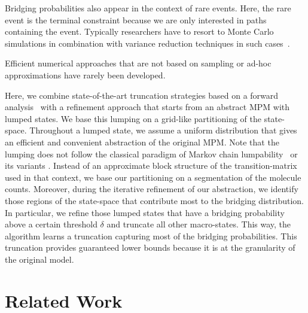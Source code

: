 
Bridging probabilities also appear in the context
of rare events.
Here, the rare event is the terminal constraint because we are only interested in paths containing the event.
Typically researchers have to resort to Monte Carlo simulations in combination with variance reduction techniques in such cases~\parencite{daigle2011automated,kuwahara2008efficient}.

Efficient  numerical approaches  that are not based on sampling or ad-hoc approximations have rarely been developed.

Here, we combine state-of-the-art truncation strategies based on a forward analysis~\parencite{lapin2011shave,andreychenko2011parameter} with a refinement approach that starts from an abstract \ac{MPM}
with lumped states.
We base this lumping on a grid-like partitioning of the state-space.
Throughout a lumped state, we assume a uniform distribution that gives an efficient and convenient abstraction of the original \ac{MPM}.
Note that the lumping does not follow the classical paradigm of Markov chain lumpability~\parencite{buchholz1994exact}
or its variants \parencite{dayar1997quasi}.
Instead of an approximate block structure of the transition-matrix used in that context, we base our partitioning on a segmentation of the molecule counts.
Moreover, during the iterative refinement of our
abstraction, we identify those regions of
the state-space that contribute most to the
bridging distribution.
In particular, we refine those lumped states that have a 
bridging probability above a certain threshold $\delta$ and
truncate all other macro-states. 
This way, the algorithm learns a truncation capturing most of the bridging probabilities. 
This truncation provides guaranteed lower bounds because it is at the granularity of the original model.

\section{Related Work}\label{sec:bridging:related}
